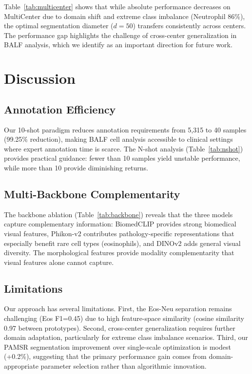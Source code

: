 \documentclass[preprint,review,12pt]{elsarticle}
\begin{document}
Table~\ref{tab:multicenter} shows that while absolute performance decreases on MultiCenter due to domain shift and extreme class imbalance (Neutrophil 86\%), the optimal segmentation diameter ($d=50$) transfers consistently across centers. The performance gap highlights the challenge of cross-center generalization in BALF analysis, which we identify as an important direction for future work.


\section{Discussion}
\label{sec:discussion}

\subsection{Annotation Efficiency}

Our 10-shot paradigm reduces annotation requirements from 5,315 to 40 samples (99.25\% reduction), making BALF cell analysis accessible to clinical settings where expert annotation time is scarce. The N-shot analysis (Table~\ref{tab:nshot}) provides practical guidance: fewer than 10 samples yield unstable performance, while more than 10 provide diminishing returns.

\subsection{Multi-Backbone Complementarity}

The backbone ablation (Table~\ref{tab:backbone}) reveals that the three models capture complementary information: BiomedCLIP provides strong biomedical visual features, Phikon-v2 contributes pathology-specific representations that especially benefit rare cell types (eosinophils), and DINOv2 adds general visual diversity. The morphological features provide modality complementarity that visual features alone cannot capture.

\subsection{Limitations}

Our approach has several limitations. First, the Eos-Neu separation remains challenging (Eos F1=0.45) due to high feature-space similarity (cosine similarity 0.97 between prototypes). Second, cross-center generalization requires further domain adaptation, particularly for extreme class imbalance scenarios. Third, our PAMSR segmentation improvement over single-scale optimization is modest (+0.2\%), suggesting that the primary performance gain comes from domain-appropriate parameter selection rather than algorithmic innovation.
\end{document}
